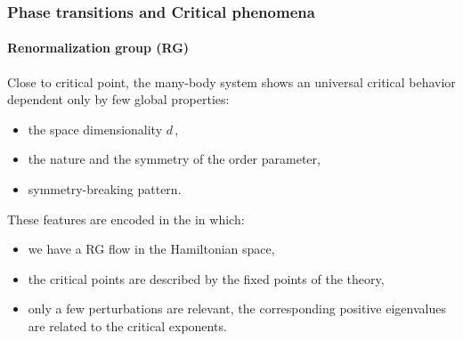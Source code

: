 \begin{frame}
\frametitle{Phase transitions and Critical phenomena}
\framesubtitle{Renormalization group (RG)}


Close to critical point, the many-body system shows an universal critical behavior dependent only by few global properties:
\begin{itemize}
\item \alert{the space dimensionality $d\,$},
\item \alert{the nature and the symmetry of the order parameter},
\item \alert{symmetry-breaking pattern}.
\end{itemize}
$ $\\
$ $\\
These features are encoded in the  in which:
\begin{itemize}
\item we have a RG flow in the Hamiltonian space,
\item the critical points are described by the fixed points of the theory,
\item only a few perturbations are relevant, the corresponding positive eigenvalues are related to the critical exponents.
\end{itemize}
\end{frame}




